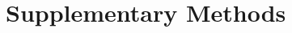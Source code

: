 \documentclass[pdflatex,sn-nature,iicol]{sn-jnl}
\begin{document}
\clearpage


\clearpage
\setcounter{table}{0}\setcounter{figure}{0}\setcounter{equation}{0}
\renewcommand{\tablename}{Table}\renewcommand{\figurename}{Fig.}
\renewcommand{\theequation}{S\arabic{equation}}
\renewcommand{\thefigure}{S\arabic{figure}}\renewcommand{\thetable}{S\arabic{table}}



\section*{Supplementary Methods}



\end{document}
